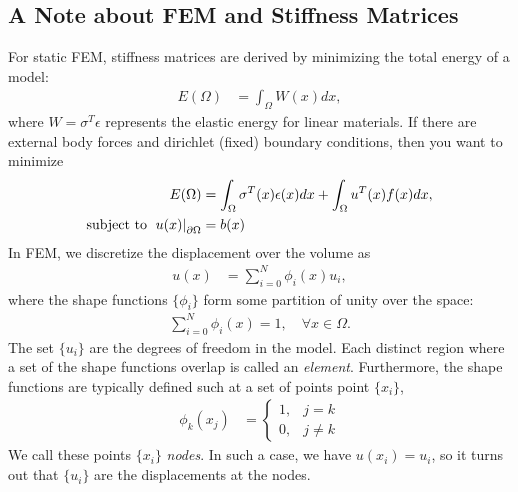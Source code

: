 \documentclass[10pt]{article}
\begin{document}
\subsection{A Note about FEM and Stiffness Matrices}

For static FEM, stiffness matrices are derived by minimizing the total energy of a model:
\begin{align}
  E(\Omega) & = \int_\Omega W(x) dx,
\end{align}
where $W=\sigma^T\epsilon$ represents the elastic energy for linear materials.  If there are
external body forces and dirichlet (fixed) boundary conditions, then you want to minimize
\begin{align}
  E(\Omega) & = \int_\Omega \sigma^T(x)\epsilon(x) dx + \int_\Omega u^T(x)f(x) dx, \label{eq:energy}\\
  \text{subject to } \left.u(x)\right|_{\partial \Omega} & = b(x)\notag
\end{align}
In FEM, we discretize the displacement over the volume as
\begin{align}
  u(x) &= \sum_{i=0}^N\phi_i(x)u_i, \label{eq:discretize}
\end{align}
where the shape functions $\{\phi_i\}$ form some partition of unity over the space:
\begin{align}
 \sum_{i=0}^N\phi_i(x) = 1, \quad \forall x\in\Omega.
\end{align}
The set $\{u_i\}$ are
the degrees of freedom in the model.  Each distinct region where a set of the shape functions overlap 
is called an \emph{element}.  Furthermore, the shape functions are typically defined such at a set of points 
point $\{x_i\}$,
\begin{align}
  \phi_k(x_j)& =  \begin{cases}
		    1, & j=k\\
		    0, & j\neq k
		  \end{cases}
\end{align}
We call these points $\{x_i\}$ \emph{nodes}.  In such a case, we have $u(x_i)=u_i$, so it turns out 
that $\{u_i\}$ are the displacements at the nodes. 
\end{document}
